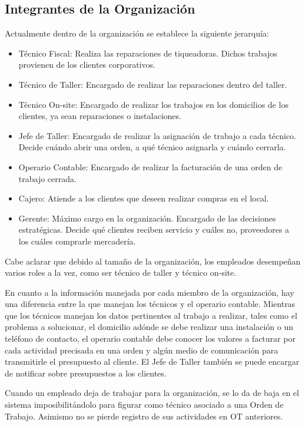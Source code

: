 \documentclass[12pt]{extarticle}
\begin{document}
\begin{spacing}{1.2}
    \subsection{Integrantes de la Organización}
    Actualmente dentro de la organización se establece la siguiente jerarquía:
    \begin{itemize}
        \item Técnico Fiscal: Realiza las reparaciones de tiqueadoras. Dichos trabajos provienen de los clientes corporativos.
        \item Técnico de Taller: Encargado de realizar las reparaciones dentro del taller.
        \item Técnico On-site: Encargado de realizar los trabajos en los domicilios de los clientes, ya sean reparaciones o instalaciones.
        \item Jefe de Taller: Encargado de realizar la asignación de trabajo a cada técnico. Decide cuándo abrir una orden, a qué técnico asignarla y cuándo cerrarla.
        \item Operario Contable: Encargado de realizar la facturación de una orden de trabajo cerrada.
        \item Cajero: Atiende a los clientes que deseen realizar compras en el local.
        \item Gerente: Máximo cargo en la organización. Encargado de las decisiones estratégicas. Decide qué clientes reciben servicio y cuáles no, proveedores a los cuáles comprarle mercadería. 
    \end{itemize}
    

    Cabe aclarar que debido al tamaño de la organización, los empleados desempeñan varios roles a la vez, como ser técnico de taller y técnico on-site.

    En cuanto a la información manejada por cada miembro de la organización, hay una diferencia entre la que manejan los técnicos y el operario contable. Mientras que los técnicos manejan los datos pertinentes al trabajo a realizar, tales como el problema a solucionar, el domicilio adónde se debe realizar una instalación o un teléfono de contacto, el operario contable debe conocer los valores a facturar por cada actividad precisada en una orden y algún medio de comunicación para transmitirle el presupuesto al cliente. El Jefe de Taller también se puede encargar de notificar sobre presupuestos a los clientes.

    Cuando un empleado deja de trabajar para la organización, se lo da de baja en el sistema imposibilitándolo para figurar como técnico asociado a una Orden de Trabajo. Asimismo no se pierde registro de sus actividades en OT anteriores. 


\end{spacing}
\end{document}
